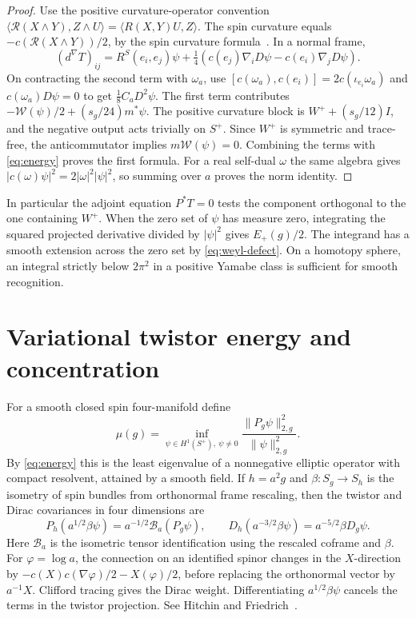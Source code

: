 \documentclass[11pt]{article}
\numberwithin{equation}{section}
\newcommand{\ip}[2]{\langle #1,#2\rangle}
\newcommand{\abs}[1]{\lvert #1\rvert}
\newcommand{\norm}[1]{\lVert #1\rVert}
\begin{document}
\begin{proof}
Use the positive curvature-operator convention
\(\ip{\mathcal R(X\wedge Y)}{Z\wedge U}=\ip{R(X,Y)U}{Z}\).
The spin curvature equals \(-c(\mathcal R(X\wedge Y))/2\), by the
spin curvature formula~\cite[\S2]{Bar1996SphereDirac}. In a normal frame,
\[
 (d^\nabla T)_{ij}
  =R^S(e_i,e_j)\psi+\tfrac14(c(e_j)\nabla_iD\psi-c(e_i)\nabla_jD\psi).
\]
On contracting the second term with \(\omega_a\), use
\([c(\omega_a),c(e_i)]=2c(\iota_{e_i}\omega_a)\) and
\(c(\omega_a)D\psi=0\) to get \(\tfrac18 C_aD^2\psi\).
The first term contributes \(-\mathcal W(\psi)/2+(s_g/24)m^*\psi\).
The positive curvature block is \(W^++(s_g/12)I\), and the
negative output acts trivially on \(S^+\). Since \(W^+\) is symmetric
and trace-free, the anticommutator implies \(m\mathcal W(\psi)=0\).
Combining the terms with \eqref{eq:energy} proves the first formula.
For a real self-dual \(\omega\) the same algebra gives
\(\abs{c(\omega)\psi}^2=2\abs{\omega}^2\abs{\psi}^2\), so summing
over \(a\) proves the norm identity.
\end{proof}

In particular the adjoint equation \(P^*T=0\) tests the component
orthogonal to the one containing \(W^+\). When the zero set of \(\psi\)
has measure zero, integrating the squared projected derivative divided
by \(\abs{\psi}^2\) gives \(E_+(g)/2\). The integrand has a smooth
extension across the zero set by \eqref{eq:weyl-defect}. On a
homotopy sphere, an integral strictly below \(2\pi^2\) in a
positive Yamabe class is sufficient for smooth recognition.

\section{Variational twistor energy and concentration}\label{sec:twistor-variation}

For a smooth closed spin four-manifold define
\[
 \mu(g)=\inf_{\psi\in H^1(S^+),\ \psi\ne0}
   \frac{\norm{P_g\psi}_{2,g}^2}{\norm{\psi}_{2,g}^2}.
\]
By \eqref{eq:energy} this is the least eigenvalue of a nonnegative
elliptic operator with compact resolvent, attained by a smooth field.
If \(h=a^2g\) and \(\beta:S_g\to S_h\) is the isometry of spin bundles
from orthonormal frame rescaling, then the twistor and Dirac
covariances in four dimensions are
\begin{equation}\label{eq:conformal-spin}
 P_h(a^{1/2}\beta\psi)=a^{-1/2}\mathcal B_a(P_g\psi),\qquad
 D_h(a^{-3/2}\beta\psi)=a^{-5/2}\beta D_g\psi .
\end{equation}
Here \(\mathcal B_a\) is the isometric tensor identification using
the rescaled coframe and \(\beta\). For \(\varphi=\log a\), the
connection on an identified spinor changes in the \(X\)-direction
by \(-c(X)c(\nabla\varphi)/2-X(\varphi)/2\), before replacing the
orthonormal vector by \(a^{-1}X\). Clifford tracing gives the
Dirac weight. Differentiating \(a^{1/2}\beta\psi\) cancels the
terms in the twistor projection. See Hitchin and
Friedrich~\cite[\S1.4]{Hitchin1974Harmonic}\cite[\S1]{Friedrich1990TwistorSpinors}.
\end{document}
